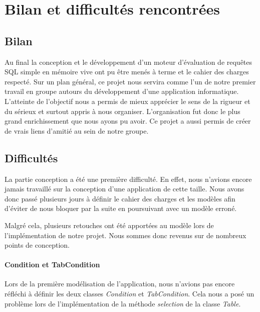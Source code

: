 \documentclass[oneside,13pt,a4paper]{report}
\begin{document}

\chapter{Bilan et difficultés rencontrées}
\section{Bilan}

Au final la conception et le développement d'un moteur d'évaluation de requêtes SQL simple en mémoire vive ont pu être menés à terme et le cahier des charges respecté. Sur un plan général, ce projet nous servira comme l'un de notre premier travail en groupe autours du développement d’une application informatique. L'atteinte de l'objectif nous a permis de mieux apprécier le sens de la rigueur et du sérieux et surtout appris à nous organiser. L'organisation fut donc le plus grand enrichissement que nous ayons pu avoir.
\newline Ce projet a aussi permis de créer de vrais liens d'amitié au sein de notre groupe.

\section{Difficultés}

La partie conception a été une première difficulté. En effet, nous n’avions encore jamais travaillé sur la conception d’une application de cette taille. Nous avons donc passé plusieurs jours à définir le cahier des charges et les modèles afin d’éviter de nous bloquer par la suite en poursuivant avec un modèle erroné.

Malgré cela, plusieurs retouches ont été apportées au modèle lors de l'implémentation de notre projet. Nous sommes donc revenus sur de nombreux points de conception.

\subsubsection{Condition et TabCondition}

Lors de la première modélisation de l'application, nous n'avions pas encore réfléchi à définir les deux classes \textit{Condition} et \textit{TabCondition}. Cela nous a posé un problème lors de l'implémentation de la méthode \textit{selection} de la classe \textit{Table}.
\end{document}

